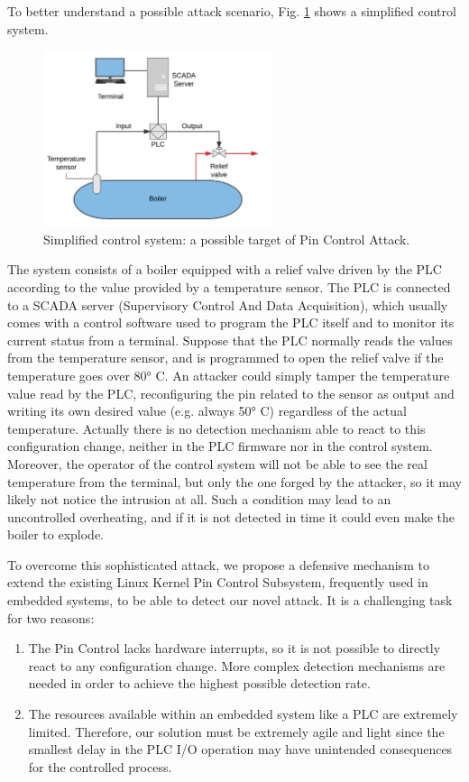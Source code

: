 To better understand a possible attack scenario, Fig. \ref{fig:control} shows a simplified control system.
\begin{figure}[h]
\centerline{\includegraphics[width=0.6\textwidth]{res/control}}
\caption{Simplified control system: a possible target of Pin Control Attack.\label{fig:control}}
\end{figure}
The system consists of a boiler equipped with a relief valve driven by the PLC according to the value provided by a temperature sensor.
The PLC is connected to a SCADA server (Supervisory Control And Data Acquisition), which usually comes with a control software used to program the PLC itself
and to monitor its current status from a terminal.
Suppose that the PLC normally reads the values from the temperature sensor, and is programmed to open the relief valve if the temperature goes over 80° C.
An attacker could simply tamper the temperature value read by the PLC, reconfiguring the pin related to the sensor as output and writing its own desired value
(e.g. always 50° C) regardless of the actual temperature.
Actually there is no detection mechanism able to react to this configuration change, neither in the PLC firmware nor in the control system.
Moreover, the operator of the control system will not be able to see the real temperature from the terminal, but only the one forged by the attacker,
so it may likely not notice the intrusion at all.
Such a condition may lead to an uncontrolled overheating, and if it is not detected in time it could even make the boiler to explode.

To overcome this sophisticated attack, we propose a defensive mechanism to extend the existing Linux Kernel Pin Control Subsystem, frequently used in embedded systems,
to be able to detect our novel attack. It is a challenging task for two reasons:
\begin{enumerate}
	\item The Pin Control lacks hardware interrupts, so it is not possible to directly react to any configuration change. More complex detection mechanisms are needed
		in order to achieve the highest possible detection rate.
	\item The resources available within an embedded system like a PLC are extremely limited. Therefore, our solution must be extremely agile and light
		since the smallest delay in the PLC I/O operation may have unintended consequences for the controlled process.
\end{enumerate}

